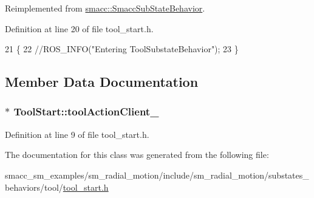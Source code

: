 Reimplemented from \hyperlink{classsmacc_1_1SmaccSubStateBehavior_a1f87ab55c1805b2a2fd9c022807d35b9}{smacc\+::\+Smacc\+Sub\+State\+Behavior}.



Definition at line 20 of file tool\+\_\+start.\+h.


\begin{DoxyCode}
21     \{
22       \textcolor{comment}{//ROS\_INFO("Entering ToolSubstateBehavior");}
23     \}
\end{DoxyCode}


\subsection{Member Data Documentation}
\subsubsection[{\texorpdfstring{tool\+Action\+Client\+\_\+}{toolActionClient_}}]{$\ast$ Tool\+Start\+::tool\+Action\+Client\+\_\+}\hypertarget{classToolStart_ad9fabf93fd9edf374496393ad6733b27}{}\label{classToolStart_ad9fabf93fd9edf374496393ad6733b27}


Definition at line 9 of file tool\+\_\+start.\+h.



The documentation for this class was generated from the following file\+:\begin{DoxyCompactItemize}
\item 
smacc\+\_\+sm\+\_\+examples/sm\+\_\+radial\+\_\+motion/include/sm\+\_\+radial\+\_\+motion/substates\+\_\+behaviors/tool/\hyperlink{tool__start_8h}{tool\+\_\+start.\+h}\end{DoxyCompactItemize}
